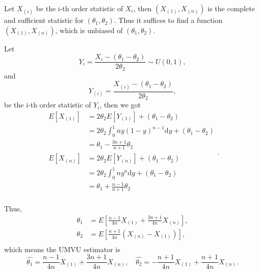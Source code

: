 \begin{solution}
    Let $X_{(i)}$ be the i-th order statistic of $X_i$, then $\left(X_{(1)},X_{(n)}\right)$ is the complete and sufficient statistic for $(\theta_1,\theta_2)$. Thus it suffices to find a function $\left(X_{(1)},X_{(n)}\right)$, which is unbiased of $(\theta_1,\theta_2)$.

    Let
    \begin{equation*}
        Y_i=\frac{X_i-(\theta_1-\theta_2)}{2\theta_2}\sim U(0,1),
    \end{equation*}
    and
    \begin{equation*}
        Y_{(i)}=\frac{X_{(i)}-(\theta_1-\theta_2)}{2\theta_2},
    \end{equation*}
    be the i-th order statistic of $Y_i$, then we got
    \begin{equation*}
        \begin{aligned}
            E[X_{(1)}] &= 2\theta_2E[Y_{(1)}]+(\theta_1-\theta_2) \\
            &= 2\theta_2\int_{0}^{1}ny(1-y)^{n-1}\mathrm{d}y+(\theta_1-\theta_2) \\
            &= \theta_1-\frac{3n+1}{n+1}\theta_2 \\
            E[X_{(n)}] &= 2\theta_2E[Y_{(n)}]+(\theta_1-\theta_2) \\
            &= 2\theta_2\int_{0}^{1}ny^{n}\mathrm{d}y+(\theta_1-\theta_2) \\
            &= \theta_1+\frac{n-1}{n+1}\theta_2 \\
        \end{aligned}.
    \end{equation*}

    Thus,
    \begin{equation*}
        \begin{aligned}
            \theta_1 &= E\left[\frac{n-1}{4n}X_{(1)}+\frac{3n+1}{4n}X_{(n)}\right], \\
            \theta_2 &= E\left[\frac{n+1}{4n}\left(X_{(n)}-X_{(1)}\right)\right], \\
        \end{aligned}
    \end{equation*}
    which means the UMVU estimator is
    \begin{equation*}
        \hat{\theta_1}=\frac{n-1}{4n}X_{(1)}+\frac{3n+1}{4n}X_{(n)},\quad\hat{\theta_2}=-\frac{n+1}{4n}X_{(1)}+\frac{n+1}{4n}X_{(n)}.
    \end{equation*}
\end{solution}

